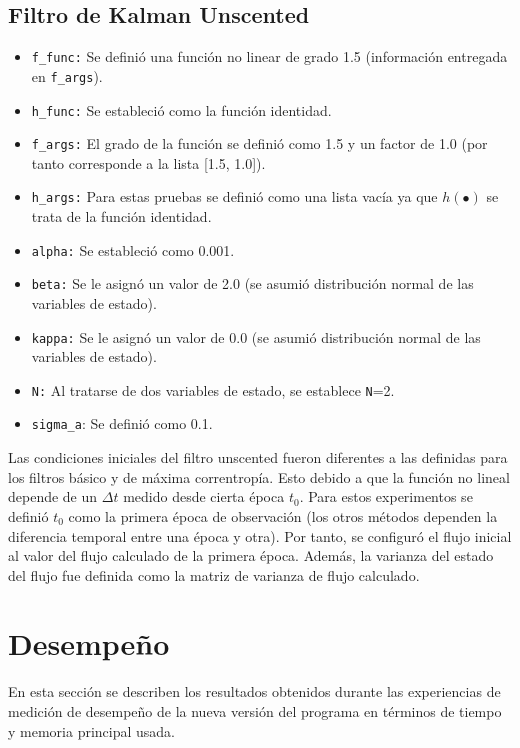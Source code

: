 \subsection*{Filtro de Kalman Unscented}
\begin{itemize}
\item \texttt{f\_func:} Se defini\'o una funci\'on no linear de grado 1.5 (informaci\'on entregada en \texttt{f\_args}).
\item \texttt{h\_func:} Se estableci\'o como la funci\'on identidad.
\item \texttt{f\_args:} El grado de la funci\'on se defini\'o como 1.5 y un factor de 1.0 (por tanto corresponde a la lista [1.5, 1.0]).
\item \texttt{h\_args:} Para estas pruebas se defini\'o como una lista vac\'ia ya que $h(•)$ se trata de la funci\'on identidad.
\item \texttt{alpha:} Se estableci\'o como 0.001.
\item \texttt{beta:} Se le asign\'o un valor de 2.0 (se asumi\'o distribuci\'on normal de las variables de estado). 
\item \texttt{kappa:} Se le asign\'o un valor de 0.0 (se asumi\'o distribuci\'on normal de las variables de estado).
\item \texttt{N:} Al tratarse de dos variables de estado, se establece \texttt{N}=2.
\item \texttt{sigma\_a}: Se defini\'o como 0.1.
\end{itemize}
Las condiciones iniciales del filtro unscented fueron diferentes a las definidas para los filtros b\'asico y de m\'axima correntrop\'ia. Esto debido a que la funci\'on no lineal depende de un $\Delta t$ medido desde cierta \'epoca $t_0$. Para estos experimentos se defini\'o $t_0$ como la primera \'epoca de observaci\'on (los otros m\'etodos dependen la diferencia temporal entre una \'epoca y otra). Por tanto, se configur\'o el flujo inicial al valor del flujo calculado de la primera \'epoca. Adem\'as, la varianza del estado del flujo fue definida como la matriz de varianza de flujo calculado.


\section{Desempe\~no}
En esta secci\'on se describen los resultados obtenidos durante las experiencias de medici\'on de desempe\~no de la nueva versi\'on del programa en t\'erminos de tiempo y memoria principal usada. 
\bigskip

